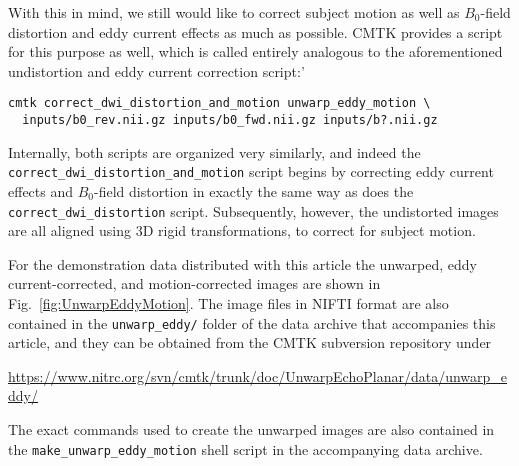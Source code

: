 \documentclass{InsightArticle}
\begin{document}
With this in mind, we still would like to correct subject motion as well as
$B_0$-field distortion and eddy current effects as much as possible. CMTK
provides a script for this purpose as well, which is called entirely analogous
to the aforementioned undistortion and eddy current correction script:'
\begin{verbatim}
cmtk correct_dwi_distortion_and_motion unwarp_eddy_motion \
  inputs/b0_rev.nii.gz inputs/b0_fwd.nii.gz inputs/b?.nii.gz
\end{verbatim}

Internally, both scripts are organized very similarly, and indeed the
\verb|correct_dwi_distortion_and_motion| script begins by correcting eddy
current effects and $B_0$-field distortion in exactly the same way as does the
\verb|correct_dwi_distortion| script. Subsequently, however, the undistorted
images are all aligned using 3D rigid transformations, to correct for subject
motion.

For the demonstration data distributed with this article the unwarped, eddy
current-corrected, and motion-corrected images are shown in
Fig.~\ref{fig:UnwarpEddyMotion}. The image files in NIFTI format are
also contained in the \verb|unwarp_eddy/| folder of the data archive that
accompanies this article, and they can be obtained from the CMTK subversion
repository under

\centerline{\url{https://www.nitrc.org/svn/cmtk/trunk/doc/UnwarpEchoPlanar/data/unwarp_eddy/}}

The exact commands used to create the unwarped images are also contained in
the \verb|make_unwarp_eddy_motion| shell script in the accompanying data archive.
\end{document}
